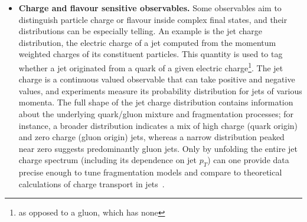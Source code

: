 \begin{itemize}
            Unfolding these jet substructure distributions in an unbinned way provides a high resolution view of QCD dynamics and is increasingly necessary as theory tools\footnote{like analytic resummation or first principles simulation} improve to the point of predicting differential shapes~\cite{Canelli:2025ybb, H1:2021wkz, Shmakov:2024gkd}.
            In fact, recent measurements have demonstrated the power of full phase space unfolding for jets, using multivariate ML techniques to correct detector effects and obtain particle level jet observable spectra without binning~\cite{Arratia:2021otl, Milton:2025mug,collaboration_machine_2024, collaboration_machine_2025, Aguilar-Saavedra:2014kpa}.
            These cases underscore that jet physics benefits enormously from preserving the full shape information.
        \item \textbf{Charge and flavour sensitive observables.}
            Some observables aim to distinguish particle charge or flavour inside complex final states, and their distributions can be especially telling.
            An example is the jet charge distribution, the electric charge of a jet computed from the momentum weighted charges of its constituent particles.
            This quantity is used to tag whether a jet originated from a quark of a given electric charge\footnote{as opposed to a gluon, which has none}.
            The jet charge is a continuous valued observable that can take positive and negative values, and experiments measure its probability distribution for jets of various momenta.
            The full shape of the jet charge distribution contains information about the underlying quark/gluon mixture and fragmentation processes;
            for instance, a broader distribution indicates a mix of high charge (quark origin) and zero charge (gluon origin) jets, whereas a narrow distribution peaked near zero suggests predominantly gluon jets.
            Only by unfolding the entire jet charge spectrum (including its dependence on jet $p_T$) can one provide data precise enough to tune fragmentation models and compare to theoretical calculations of charge transport in jets~\cite{CMS:2017yer,CMS:2020plq,Larkoski:2024uoc,Accardi:2022oog,Baldenegro:2024pfb,AbdulKhalek:2021gbh, Larkoski2020JetLearning}.
            

\end{itemize}

